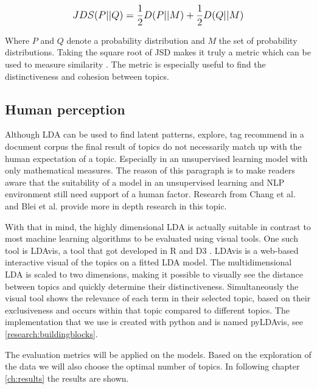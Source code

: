 \[
\mathlarger{JDS(P||Q) = \frac{1}{2}D(P||M) + \frac{1}{2}D(Q||M)}
\]

Where $P$ and $Q$ denote a probability distribution and $M$ the set of probability distributions. Taking the square root of JSD makes it truly a metric which can be used to measure similarity \cite{Huang2008}. The metric is especially useful to find the distinctiveness and cohesion between topics.

\subsection{Human perception}\label{methodology:humanperception}
Although LDA can be used to find latent patterns, explore, tag recommend in a document corpus the final result of topics do not necessarily match up with the human expectation of a topic. Especially in an unsupervised learning model with only mathematical measures\cite{Towne2016MeasuringPerception}. The reason of this paragraph is to make readers aware that the suitability of a model in an unsupervised learning and NLP environment still need support of a human factor. Research from Chang  et al. \cite{Chang2009} and Blei et al. \cite{Chaney2012VisualizingModels.} provide more in depth research in this topic.  

With that in mind, the highly dimensional LDA is actually suitable in contrast to most machine learning algorithms to be evaluated using visual tools. One such tool is LDAvis, a tool that got developed in R and D3 \cite{Sievert2014}. LDAvis is a web-based interactive visual of the topics on a fitted LDA model. The multidimensional LDA is scaled to two dimensions, making it possible to visually see the distance between topics and quickly determine their distinctiveness. Simultaneously the visual tool shows the relevance of each term in their selected topic, based on their exclusiveness and occurs within that topic compared to different topics. The implementation that we use is created with python and is named pyLDAvis, see \ref{research:buildingblocks}. 

The evaluation metrics will be applied on the models. Based on the exploration of the data we will also choose the optimal number of topics. In following chapter \ref{ch:results} the results are shown. 